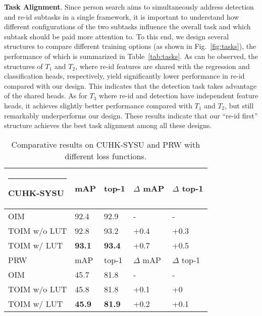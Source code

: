 \documentclass[journal]{IEEEtran}
\makeatletter
\newcommand{\thickhline}{\noalign {\ifnum 0=`}\fi \hrule height 1pt
    \futurelet \reserved@a \@xhline
}
\makeatother
\begin{document}
\textbf{Task Alignment}.
Since person search aims to simultaneously address detection and re-id subtasks in a single framework, it is important to understand how different configurations of the two subtasks influence the overall task and which subtask should be paid more attention to. To this end, we design several structures to compare different training options (as shown in Fig.~\ref{fig:tasks}), the performance of which is summarized in Table~\ref{tab:tasks}. As can be observed, the structures of $T_1$ and $T_2$, where re-id features are shared with the regression and classification heads, respectively, yield significantly lower performance in re-id compared with our design. This indicates that the detection task takes advantage of the shared heads. As for $T_3$ where re-id and detection have independent feature heads, it achieves slightly better performance compared with $T_1$ and $T_2$, but still remarkably underperforms our design. 
These results indicate that our ``re-id first'' structure achieves the best task alignment among all these designs.



\begin{table}[t]
\small
\centering
\begin{tabular}{p{2.4cm}|p{0.8cm}<{\centering}p{0.8cm}<{\centering}|p{1.1cm}<{\centering}p{1.2cm}<{\centering}}
\hline\thickhline
\rowcolor{mygray} 
{CUHK-SYSU}  & mAP & top-1  & $\Delta$ mAP  & $\Delta$ top-1  \\  \hline \hline     
OIM
   & 92.4   & 92.9       & -   & -  \\
TOIM w/o LUT  & 92.8   & 93.2       & +0.4   & +0.3   \\ 
TOIM  w/ LUT  &\textbf{93.1} & \textbf{93.4} & +0.7    & +0.5\\\hline
\rowcolor{mygray} 
{PRW}  & mAP & top-1  & $\Delta$ mAP  & $\Delta$ top-1  \\  \hline \hline     
OIM
   & 45.7   & 81.8       & -   & -  \\
TOIM w/o LUT  & 45.8   & 81.8       & +0.1   & +0   \\ 
TOIM  w/ LUT  &\textbf{45.9} & \textbf{81.9} & +0.2    & +0.1\\\hline
\end{tabular}
\caption{Comparative results on CUHK-SYSU and PRW with different loss functions. }
\label{tab:toim}
\end{table}
\end{document}
